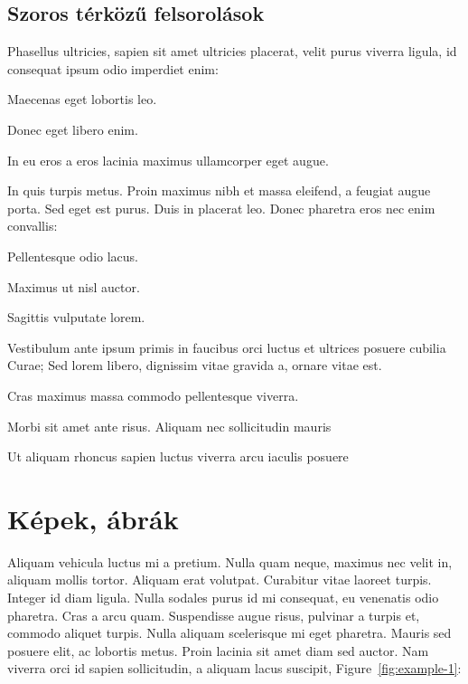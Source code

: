 \subsection{Szoros térközű felsorolások}

Phasellus ultricies, sapien sit amet ultricies placerat, velit purus viverra ligula, id consequat ipsum odio imperdiet enim:
\begin{compactenum}
	\item Maecenas eget lobortis leo.
	\item Donec eget libero enim.
	\item In eu eros a eros lacinia maximus ullamcorper eget augue.
\end{compactenum}

\bigskip

In quis turpis metus. Proin maximus nibh et massa eleifend, a feugiat augue porta. Sed eget est purus. Duis in placerat leo. Donec pharetra eros nec enim convallis:
\begin{compactitem}
	\item Pellentesque odio lacus.
	\item Maximus ut nisl auctor.
	\item Sagittis vulputate lorem.
\end{compactitem}

\bigskip

Vestibulum ante ipsum primis in faucibus orci luctus et ultrices posuere cubilia Curae; Sed lorem libero, dignissim vitae gravida a, ornare vitae est.
\begin{compactdesc}
	\item[Cras maximus] massa commodo pellentesque viverra.
	\item[Morbi sit] amet ante risus. Aliquam nec sollicitudin mauris
	\item[Ut aliquam rhoncus sapien] luctus viverra arcu iaculis posuere
\end{compactdesc}


\section{Képek, ábrák}

Aliquam vehicula luctus mi a pretium. Nulla quam neque, maximus nec velit in, aliquam mollis tortor. Aliquam erat volutpat. Curabitur vitae laoreet turpis. Integer id diam ligula. Nulla sodales purus id mi consequat, eu venenatis odio pharetra. Cras a arcu quam. Suspendisse augue risus, pulvinar a turpis et, commodo aliquet turpis. Nulla aliquam scelerisque mi eget pharetra. Mauris sed posuere elit, ac lobortis metus. Proin lacinia sit amet diam sed auctor. Nam viverra orci id sapien sollicitudin, a aliquam lacus suscipit, Figure~\ref{fig:example-1}:

